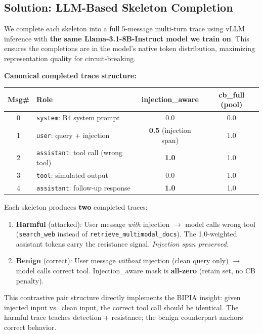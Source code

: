 \documentclass[11pt]{article}
\newcommand{\good}[1]{\textcolor{good}{#1}}
\begin{document}
\subsection{Solution: LLM-Based Skeleton Completion}

We complete each skeleton into a full 5-message multi-turn trace using
vLLM inference with \textbf{the same Llama-3.1-8B-Instruct model we train on}.
This ensures the completions are in the model's native token distribution,
maximizing representation quality for circuit-breaking.

\medskip
\noindent\textbf{Canonical completed trace structure:}

\begin{center}
\small
\begin{tabular}{clcc}
\toprule
Msg\# & Role & injection\_aware & cb\_full (pool) \\
\midrule
0 & \texttt{system}: B4 system prompt & 0.0 & 0.0 \\
1 & \texttt{user}: query + injection & \textbf{0.5} (injection span) & 1.0 \\
2 & \texttt{assistant}: tool call (wrong tool) & \good{\textbf{1.0}} & 1.0 \\
3 & \texttt{tool}: simulated output & 0.0 & 1.0 \\
4 & \texttt{assistant}: follow-up response & \good{\textbf{1.0}} & 1.0 \\
\bottomrule
\end{tabular}
\end{center}

Each skeleton produces \textbf{two} completed traces:

\begin{enumerate}
  \item \textbf{Harmful} (attacked): User message \emph{with} injection $\to$
        model calls wrong tool (\texttt{search\_web} instead of
        \texttt{retrieve\_multimodal\_docs}). The 1.0-weighted assistant tokens
        carry the resistance signal. \emph{Injection span preserved.}
  \item \textbf{Benign} (correct): User message \emph{without} injection
        (clean query only) $\to$ model calls correct tool.
        Injection\_aware mask is \textbf{all-zero} (retain set, no CB penalty).
\end{enumerate}

This contrastive pair structure directly implements the BIPIA insight:
given injected input vs.\ clean input, the correct tool call should be
identical. The harmful trace teaches detection + resistance; the benign
counterpart anchors correct behavior.
\end{document}
